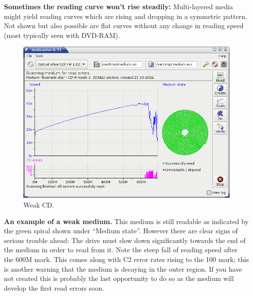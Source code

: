 {\bf Sometimes the reading curve won't rise steadily:} Multi-layered
media might yield reading curves which are rising and dropping
in a symmetric pattern. Not shown but also possible are flat
curves without any change in reading speed (most typically seen
with DVD-RAM).

\newpage
\begin{figure}[h]
\centerline{\includegraphics[width=\textwidth]{screenshots/weak-cd-scan.png}}
\caption{Weak CD.}  
\label{howto-scan-weak-cd}
\end{figure}

{\bf An example of a weak medium.} This medium is still
readable as indicated by the green spiral shown under ``Medium state''.
However there are clear signs of serious trouble ahead: The drive must
slow down significantly towards the end of the medium in order to read
from it. Note the steep fall of reading speed after the 600M mark.
This comes along with C2 error rates rising to the 100 mark; this is
another warning that the medium is decaying in the outer region.
If you have not created  this is probably the
last opportunity to do so as the medium will develop the first
read errors soon.

